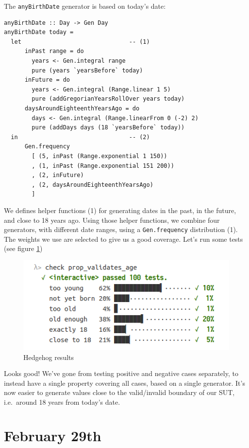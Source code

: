 The \texttt{anyBirthDate} generator is based on today's date:

\begin{verbatim}
anyBirthDate :: Day -> Gen Day
anyBirthDate today =
  let                               -- (1)
      inPast range = do
        years <- Gen.integral range
        pure (years `yearsBefore` today)
      inFuture = do
        years <- Gen.integral (Range.linear 1 5)
        pure (addGregorianYearsRollOver years today)
      daysAroundEighteenthYearsAgo = do
        days <- Gen.integral (Range.linearFrom 0 (-2) 2)
        pure (addDays days (18 `yearsBefore` today))
  in                                -- (2)
      Gen.frequency
        [ (5, inPast (Range.exponential 1 150))
        , (1, inPast (Range.exponential 151 200))
        , (2, inFuture)
        , (2, daysAroundEighteenthYearsAgo)
        ]
\end{verbatim}
We defines helper functions (1) for generating dates in the past, in the
future, and close to 18 years ago. Using those helper functions, we
combine four generators, with different date ranges, using a
\texttt{Gen.frequency} distribution (1). The weights we use are selected
to give us a good coverage.
Let's run some tests (see figure \ref{fig:hedgehog5})
\begin{figure}[htbp]
 \centering
 \includegraphics[width=.95\linewidth]{./pics/hedgehog5.png}
 \caption{Hedgehog results}
 \label{fig:hedgehog5}
\end{figure}

\noindent Looks good! We've gone from testing positive and negative cases
separately, to instead have a single property covering all cases, based
on a single generator. It's now easier to generate values close to the
valid/invalid boundary of our SUT, i.e.~around 18 years from today's
date.

\section{February 29th}\label{february-29th}

